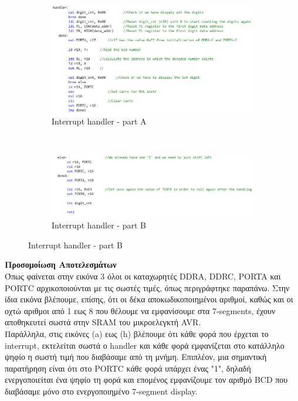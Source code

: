 \documentclass{article}
\begin{document}
	\pagebreak
	\begin{figure}[h!]
		\centering
		\begin{subfigure}[t]{0.5\textwidth}
			\centering
			\includegraphics[width=0.9\linewidth]{./results/lab2_handler_a.png}
			\caption{Interrupt handler - part A}
		\end{subfigure}%
		~
		\begin{subfigure}[t]{0.5\textwidth}
			\centering
			\includegraphics[width=1.2\linewidth]{./results/lab2_handler_b.png}
			\caption{Interrupt handler - part B}
		\end{subfigure}	
	\end{figure}
	
	\noindent
	\textbf{Προσομοίωση Αποτελεσμάτων} \\
	\noindent
	Όπως φαίνεται στην εικόνα 3 όλοι οι καταχωρητές DDRA, DDRC, PORTA και PORTC αρχικοποιούνται με τις σωστές τιμές, όπως περιγράφτηκε παραπάνω. Στην ίδια εικόνα βλέπουμε, επίσης, ότι οι δέκα αποκωδικοποιημένοι αριθμοί, καθώς και οι οχτώ αριθμοι από 1 εως 8 που θέλουμε να εμφανίσουμε στα 7-segments, έχουν αποθηκευτεί σωστά στην SRAM του μικροελεγκτή AVR. \\
	
	\noindent
	Παράλληλα, στις εικόνες (a) εως (h) βλέπουμε ότι κάθε φορά που έρχεται το interrupt, εκτελείται σωστά ο handler και κάθε φορά εμφανίζεται στο κατάλληλο ψηφίο η σωστή τιμή που διαβάσαμε από τη μνήμη. Επιπλέον, μια σημαντική παρατήρηση είναι ότι στο PORTC κάθε φορά υπάρχει ένας "1", δηλαδή ενεργοποιείται ένα ψηφίο τη φορά και επομένος εμφανίζουμε τον αριθμό BCD που διαβάσαμε μόνο στο ενεργοποιημένο 7-segment display. \\
	
\end{document}

